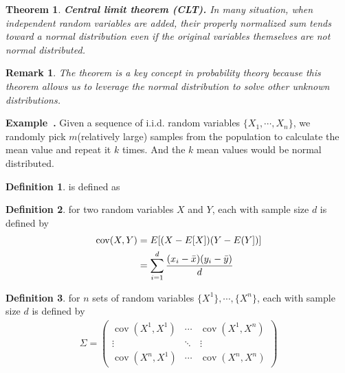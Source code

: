 \documentclass[a4paper]{article}
\theoremstyle{definition}
\newtheorem{definition}{Definition}
\theoremstyle{plain}
\newtheorem{theorem}{Theorem}
\newtheorem{remark}{Remark}
\newenvironment{example}[1][]{\refstepcounter{example}\par\medskip
   \noindent \textbf{Example~\theexample. #1} \rmfamily}{\medskip}
\newcounter{example}{Example}
\begin{document}
\begin{theorem}
\textbf{Central limit theorem (CLT).} In many situation, when independent random variables are added, their properly normalized sum tends toward a normal distribution even if the original variables themselves are not normal distributed.
\end{theorem}

\begin{remark}
The theorem is a key concept in probability theory because this theorem allows us to leverage the normal distribution to solve other unknown distributions.
\end{remark}

\begin{example}
Given a sequence of i.i.d. random variables $\{X_1,\cdots,X_n\}$, we randomly pick $m$(relatively large) samples from the population to calculate the mean value and repeat it $k$ times. And the $k$ mean values would be normal distributed.
\end{example}

\begin{definition}
 is defined as 

\end{definition}

\begin{definition}
 for two random variables $X$ and $Y$, each with sample size $d$ is defined by
\begin{align*}
    \operatorname{cov}(X,Y)&=E[(X-E[X])(Y-E(Y])]\\
    &=\sum^d_{i=1}\frac{(x_i-\Bar{x})(y_i-\Bar{y})}{d}
\end{align*}
\end{definition}

\begin{definition}
 for $n$ sets of random variables $\{X^1\},\cdots,\{X^n\}$, each with sample size $d$ is defined by
\begin{align*}
    \Sigma=
    \begin{pmatrix}
        \operatorname{cov}(X^1,X^1) & \cdots & \operatorname{cov}(X^1,X^n)\\
        \vdots &  \ddots &  \vdots \\
        \operatorname{cov}(X^n,X^1) & \cdots & \operatorname{cov}(X^n,X^n)
    \end{pmatrix}
\end{align*}
\end{definition}
\end{document}
